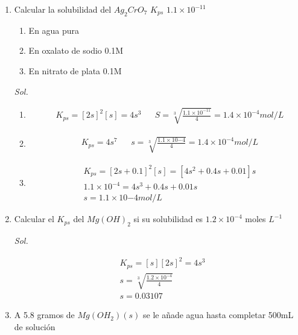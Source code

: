 \begin{enumerate}

	\item Calcular la solubilidad del $Ag_2CrO_7$ $K_{ps}$ $1.1\times 10^{-11}$

	      \begin{enumerate}
		      \item En agua pura
		      \item En oxalato de sodio 0.1M
		      \item En nitrato de plata 0.1M
	      \end{enumerate}


	      \textit{ Sol. }

	      \begin{enumerate}
		      \item
		            \begin{align*}
			             & K_{ps}=[2s]^2[s]=4s^3 &  & S=\sqrt[3]{\frac{1.1\times 10^{-11}}{4}}=1.4\times10^{-4}mol/L
		            \end{align*}
		      \item \begin{align*}
			             & K_{ps}=4s^7 &  & s=\sqrt[3]{\frac{1.1\times 10{-4}}{4}}=1.4\times10^{-4}mol/L
		            \end{align*}
		      \item \begin{align*}
			             & K_{ps}=[2s+0.1]^2[s]=[4s^2+0.4s+0.01]s \\
			             & 1.1\times10^{-4}=4s^3+0.4s+0.01s       \\
			             & s=1.1\times 10{-4}mol/L
		            \end{align*}
	      \end{enumerate}


	\item Calcular el $K_{ps}$ del $Mg(OH)_2$ si su solubilidad es $1.2\times 10^{-4}$ moles $L^{-1}$

	      \textit{ Sol. }

	      \begin{align*}
		       & K_{ps}=[s][2s]^2=4s^3                   \\
		       & s=\sqrt[3]{\frac{1.2\times 10^{-4}}{4}} \\
		       & s=0.03107
	      \end{align*}

	\item A 5.8 gramos de $Mg(OH_2)(s)$ se le añade agua hasta completar 500mL de solución


\end{enumerate}

